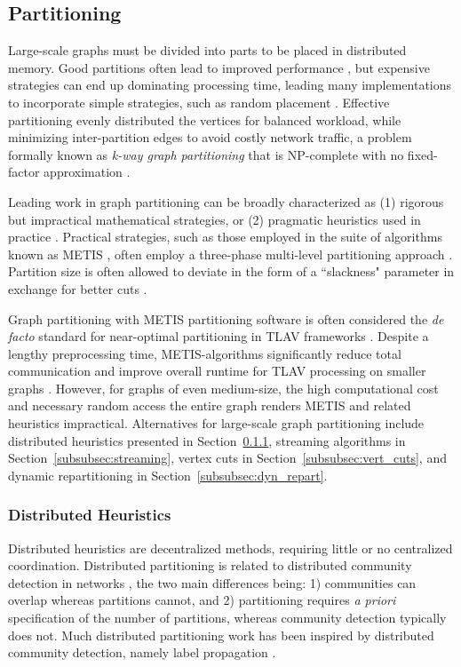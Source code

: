 \documentclass[reprint,twocolumn,showpacs,preprintnumbers,amsmath, aps,pre,amssymb]{revtex4-1}
\begin{document}
\subsection{Partitioning}
\label{subsec:partitioning}

Large-scale graphs must be divided into parts to be placed in distributed memory.  Good partitions often lead to improved performance \cite{Salihoglu2013}, but expensive strategies can end up dominating processing time, leading many implementations to incorporate simple strategies, such as random placement \cite{Jain2013}.  Effective partitioning evenly distributed the vertices for balanced workload, while minimizing inter-partition edges to avoid costly network traffic, a problem formally known as {\em k-way graph partitioning} that is NP-complete with no fixed-factor approximation \cite{Andreev2006,Meyerhenke2014}.  

Leading work in graph partitioning can be broadly characterized as (1) rigorous but impractical mathematical strategies, or (2) pragmatic heuristics used in practice \cite{Tsourakakis2014}. Practical strategies, such as those employed in the suite of algorithms known as METIS \cite{Karypis1995a}, often employ a three-phase multi-level partitioning approach \cite{Abou-Rjeili2006}.  Partition size is often allowed to deviate in the form of a ``slackness" parameter in exchange for better cuts \cite{Karypis1996}.  

Graph partitioning with METIS partitioning software is often considered the \textit{de facto} standard for near-optimal partitioning in TLAV frameworks \cite{Stanton2012}.  Despite a lengthy preprocessing time, METIS-algorithms significantly reduce total communication and improve overall runtime for TLAV processing on smaller graphs \cite{Salihoglu2013}.  However, for graphs of even medium-size, the high computational cost and necessary random access the entire graph renders METIS and related heuristics impractical.  Alternatives for large-scale graph partitioning include distributed heuristics presented in Section~\ref{subsubsec:dist_heur}, streaming algorithms in Section~\ref{subsubsec:streaming}, vertex cuts in Section~\ref{subsubsec:vert_cuts}, and dynamic repartitioning in Section~\ref{subsubsec:dyn_repart}.

\subsubsection{Distributed Heuristics}
\label{subsubsec:dist_heur}
Distributed heuristics are decentralized methods, requiring little or no centralized coordination.  Distributed partitioning is related to distributed community detection in networks \cite{Gehweiler2010,Ramaswamy2005}, the two main differences being: 1) communities can overlap whereas partitions cannot, and 2) partitioning requires \textit{a priori} specification of the number of partitions, whereas community detection typically does not.  Much distributed partitioning work has been inspired by distributed community detection, namely label propagation \cite{Raghavan2007}.
\end{document}
